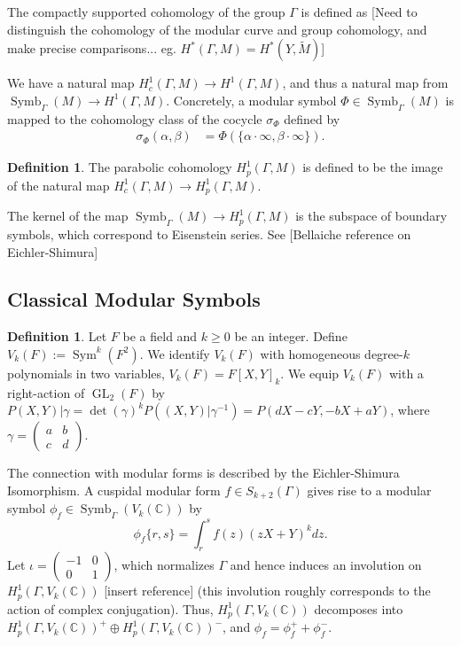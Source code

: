 \documentclass[10pt]{amsart}
\theoremstyle{plain}
\theoremstyle{definition}
\newtheorem{definition}[theorem]{Definition}
\newcommand{\CC}{{\mathbb{C}}}
\newcommand{\cH}{\mathcal{H}}
\DeclareMathOperator{\GL}{GL}
\DeclareMathOperator{\Sym}{Sym}
\DeclareMathOperator{\Symb}{Symb}
\begin{document}
The compactly supported cohomology of the group $\Gamma$ is defined as 
[Need to distinguish the cohomology of the modular curve and group cohomology, and make precise comparisons... eg. $H^*(\Gamma, M) = H^*(Y, \widetilde{M})$]



We have a natural map $H^1_c(\Gamma, M)\longrightarrow H^1(\Gamma,M)$, and thus a natural map from $\Symb_\Gamma(M)\longrightarrow H^1(\Gamma,M)$. Concretely, a modular symbol $\Phi\in \Symb_\Gamma(M)$ is mapped to the cohomology class of the cocycle $\sigma_\Phi$ defined by
\begin{align*}
\sigma_{\Phi}(\alpha, \beta) &= \Phi(\{\alpha \cdot \infty, \beta \cdot \infty\}).%
\end{align*}
\begin{definition}
The parabolic cohomology $H^1_p(\Gamma,M)$ is defined to be the image of the natural map $H^1_c(\Gamma,M)\longrightarrow H^1_p(\Gamma,M)$.
\end{definition}
The kernel of the map $\Symb_\Gamma(M)\longrightarrow H^1_p(\Gamma,M)$ is the subspace of boundary symbols, which correspond to Eisenstein series. See [Bellaiche reference on Eichler-Shimura]



\subsection{Classical Modular Symbols}
\begin{definition}
Let $F$ be a field and $k\geq 0$ be an integer. Define $V_k(F):=\Sym^k(F^2)$. We identify $V_k(F)$ with homogeneous degree-$k$ polynomials in two variables, $V_k(F) = F[X,Y]_k$. We equip $V_k(F)$ with a right-action of $\GL_2(F)$ by $P(X,Y)|\gamma =\det(\gamma)^{k}P((X,Y)|\gamma^{-1})=P(dX-cY,-bX+aY)$, where $\gamma=\begin{pmatrix} a & b \\ c & d\end{pmatrix}$. 
\end{definition}
The connection with modular forms is described by the Eichler-Shimura Isomorphism. A cuspidal modular form $f\in S_{k+2}(\Gamma)$ gives rise to a modular symbol $\phi_{f}\in \Symb_{\Gamma} (V_k(\CC))$ by
\begin{equation*}
	\phi_{f} \{r, s\} = \int_r^s f(z) (zX+Y)^k dz.
\end{equation*}
Let $\iota = \begin{pmatrix} -1 & 0 \\ 0 & 1\end{pmatrix}$, which normalizes $\Gamma$ and hence induces an involution on $H^1_p(\Gamma, V_k(\CC))$ [insert reference] (this involution roughly corresponds to the action of complex conjugation). Thus, $H^1_p(\Gamma, V_k(\CC))$ decomposes into $H^1_p(\Gamma,V_k(\CC))^+\oplus H^1_p(\Gamma,V_k(\CC))^-$, and $\phi_f = \phi_f^+ + \phi_f^-$. 
\end{document}
